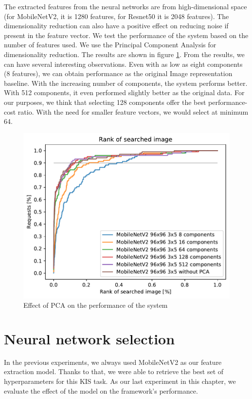 The extracted features from the neural networks are from high-dimensional space (for MobileNetV2, it is 1280 features, for Resnet50 it is 2048 features). The dimensionality reduction can also have a positive effect on reducing noise if present in the feature vector. We test the performance of the system based on the number of features used. We use the Principal Component Analysis  for dimensionality reduction. The results are shown in figure \ref{fig:pca}. From the results, we can have several interesting observations. Even with as low as eight components (8 features), we can obtain performance  as the original Image representation baseline. With the increasing number of components, the system performs better. With 512 components, it even performed slightly better as the original data. For our purposes, we think  that selecting 128 components offer the best performance-cost ratio. With the need for smaller feature vectors, we would select at minimum 64.

\begin{figure}
    \centering
    \includegraphics[width=0.8\linewidth]{graphs/6fbd4f70810e1f63f400ef601c1cdba0fd1635749810aa2347a4ff26e6fccf47.pdf}
    \caption{Effect of PCA on the performance of the system}
    \label{fig:pca}
\end{figure}

\section{Neural network selection}

In the previous experiments, we always used MobileNetV2 as our feature extraction model. Thanks to that, we were able to retrieve the best set of hyperparameters for this KIS task. As our last experiment in this chapter, we evaluate the effect of the model on the framework's performance.

